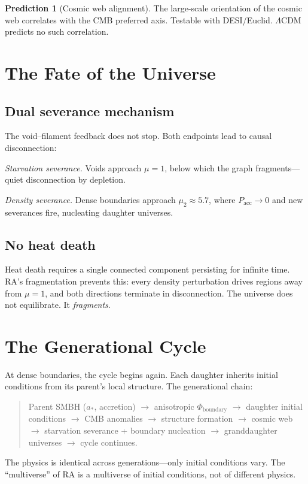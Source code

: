 \documentclass[11pt,a4paper]{article}
\theoremstyle{plain}
\theoremstyle{definition}
\newtheorem{prediction}[theorem]{Prediction}
\theoremstyle{remark}
\begin{document}
\begin{prediction}[Cosmic web alignment]\label{pred:web}
The large-scale orientation of the cosmic web correlates with the CMB preferred
axis.  Testable with DESI/Euclid.  $\Lambda$CDM predicts no such correlation.
\end{prediction}

\section{The Fate of the Universe}\label{sec:fate}

\subsection{Dual severance mechanism}\label{sec:dual}

The void--filament feedback does not stop.  Both endpoints lead to causal
disconnection:

\emph{Starvation severance.}  Voids approach $\mu = 1$, below which the graph
fragments---quiet disconnection by depletion.

\emph{Density severance.}  Dense boundaries approach $\mu_2 \approx 5.7$, where
$P_{\mathrm{acc}} \to 0$ and new severances fire, nucleating daughter universes.

\subsection{No heat death}\label{sec:noheat}

Heat death requires a single connected component persisting for infinite time.
RA's fragmentation prevents this: every density perturbation drives regions away
from $\mu = 1$, and both directions terminate in disconnection.  The universe does
not equilibrate.  It \emph{fragments}.

\section{The Generational Cycle}\label{sec:cycle}

At dense boundaries, the cycle begins again.  Each daughter inherits initial
conditions from its parent's local structure.  The generational chain:
\begin{quote}
Parent SMBH ($a_*$, accretion) $\to$ anisotropic $\Phi_{\mathrm{boundary}}$ $\to$
daughter initial conditions $\to$ CMB anomalies $\to$ structure formation $\to$
cosmic web $\to$ starvation severance + boundary nucleation $\to$ granddaughter
universes $\to$ cycle continues.
\end{quote}
The physics is identical across generations---only initial conditions vary.  The
``multiverse'' of RA is a multiverse of initial conditions, not of different physics.
\end{document}
